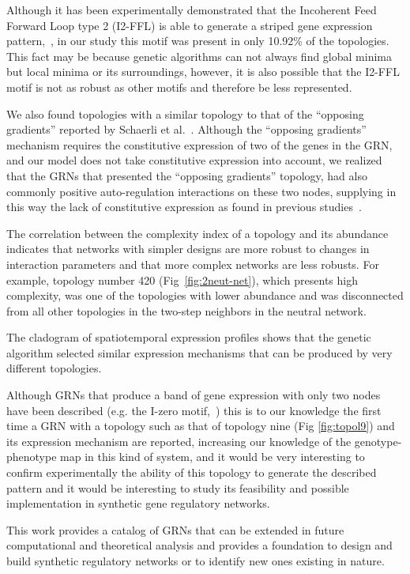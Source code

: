 \documentclass[10pt,letterpaper]{article}
\begin{document}
Although it has been experimentally demonstrated that the Incoherent Feed
Forward Loop type 2 (I2-FFL) is able to generate a striped gene expression
pattern,~\cite{Schaerli2014, Basu2005}, in our study this motif was present in
only 10.92\% of the topologies. This fact may be because genetic algorithms
can not always find global minima but local minima or its surroundings, however,
it is also possible that the I2-FFL motif is not as robust as other motifs and
therefore be less represented.

We also found topologies with a similar topology to that of the “opposing
gradients” reported by Schaerli et al.~\cite{Schaerli2018,Schaerli2014}.
Although the “opposing gradients” mechanism requires the constitutive expression
of two of the genes in the GRN, and our model does not take constitutive
expression into account, we realized that the GRNs that presented the “opposing
gradients” topology, had also commonly positive auto-regulation interactions on
these two nodes, supplying in this way the lack of constitutive
expression as found in previous studies~\cite{munteanu_2014}.

The correlation between the complexity index of a topology and its abundance
indicates that networks with simpler designs are more robust to changes in
interaction parameters and that more complex networks are less robusts. For
example, topology number 420 (Fig~\ref{fig:2neut-net}), which
presents high complexity, was one of the
topologies with lower abundance and was disconnected from all other topologies
in the two-step neighbors in the neutral network.

The cladogram of spatiotemporal expression profiles shows that the genetic
algorithm selected similar expression mechanisms that can be produced by very
different topologies.

Although GRNs that produce a band of gene expression with only two nodes have
been described (e.g. the I-zero motif,~\cite{Schaerli2014}) this is to our
knowledge the first time a GRN with a topology such as that of topology nine
(Fig \ref{fig:topol9})
and its expression mechanism are reported, increasing our knowledge of the
genotype-phenotype map in this kind of system, and it would be very interesting
to confirm experimentally the ability of this topology to generate the described
pattern and it would be interesting to study its feasibility and possible
implementation in synthetic gene regulatory networks.

This work provides a catalog of GRNs that can be extended in future computational
and theoretical analysis and provides a foundation to design and build synthetic
regulatory networks or to identify new ones existing in nature.
\end{document}
